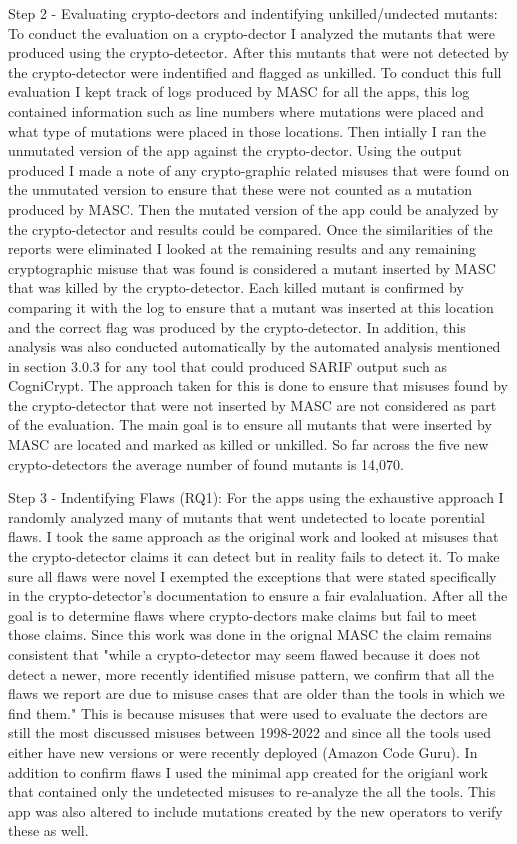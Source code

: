Step 2 - Evaluating crypto-dectors and indentifying unkilled/undected mutants: To conduct the evaluation on a crypto-dector I analyzed the mutants that were produced using the crypto-detector. After this mutants that were not detected by the crypto-detector were indentified and flagged as unkilled. To conduct this full evaluation I kept track of logs produced by MASC for all the apps, this log contained information such as line numbers where mutations were placed and what type of mutations were placed in those locations. Then intially I ran the unmutated version of the app against the crypto-dector. Using the output produced I made a note of any crypto-graphic related misuses that were found on the unmutated version to ensure that these were not counted as a mutation produced by MASC. Then the mutated version of the app could be analyzed by the crypto-detector and results could be compared. Once the similarities of the reports were eliminated I looked at the remaining results and any remaining cryptographic misuse that was found is considered a mutant inserted by MASC that was killed by the crypto-detector. Each killed mutant is confirmed by comparing it with the log to ensure that a mutant was inserted at this location and the correct flag was produced by the crypto-detector. In addition, this analysis was also conducted automatically by the automated analysis mentioned in section 3.0.3 for any tool that could produced SARIF output such as CogniCrypt. The approach taken for this is done to ensure that misuses found by the crypto-detector that were not inserted by MASC are not considered as part of the evaluation. The main goal is to ensure all mutants that were inserted by MASC are located and marked as killed or unkilled. So far across the five new crypto-detectors the average number of found mutants is 14,070.

Step 3 - Indentifying Flaws (RQ1): For the apps using the exhaustive approach I randomly analyzed many of mutants that went undetected to locate porential flaws. I took the same approach as the original work and looked at misuses that the crypto-detector claims it can detect but in reality fails to detect it. To make sure all flaws were novel I exempted the exceptions that were stated specifically in the crypto-detector's documentation to ensure a fair evalaluation. After all the goal is to determine flaws where crypto-dectors make claims but fail to meet those claims. Since this work was done in the orignal MASC the claim remains consistent that "while a crypto-detector may seem flawed because it does not detect a newer, more recently identified misuse pattern, we confirm that all the flaws we report are due to misuse cases that are older than the tools in which we find them." This is because misuses that were used to evaluate the dectors are still the most discussed misuses between 1998-2022 and since all the tools used either have new versions or were recently deployed (Amazon Code Guru). In addition to confirm flaws I used the minimal app created for the origianl work that contained only the undetected misuses to re-analyze the all the tools. This app was also altered to include mutations created by the new operators to verify these as well.

